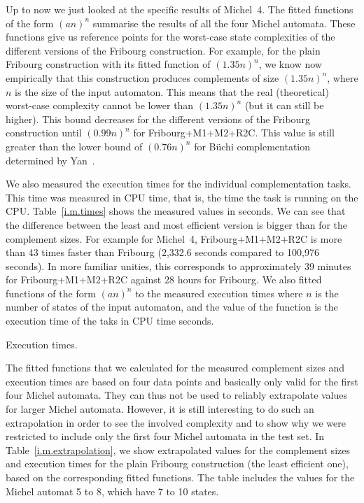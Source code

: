 Up to now we just looked at the specific results of Michel~4. The fitted functions of the form $(an)^n$ summarise the results of all the four Michel automata. These functions give us reference points for the worst-case state complexities of the different versions of the Fribourg construction. For example, for the plain Fribourg construction with its fitted function of $(1.35n)^n$, we know now empirically that this construction produces complements of size $(1.35n)^n$, where $n$ is the size of the input automaton. This means that the real (theoretical) worst-case complexity cannot be lower than $(1.35n)^n$ (but it can still be higher). This bound decreases for the different versions of the Fribourg construction until $(0.99n)^n$ for Fribourg+M1+M2+R2C. This value is still greater than the lower bound of $(0.76n)^n$ for Büchi complementation determined by Yan~\cite{2006_yan}.

We also measured the execution times for the individual complementation tasks. This time was measured in CPU time, that is, the time the task is running on the CPU. Table~\ref{i.m.times} shows the measured values in seconds. We can see that the difference between the least and most efficient version is bigger than for the complement sizes. For example for Michel~4, Fribourg+M1+M2+R2C is more than 43 times faster than Fribourg (2,332.6 seconds compared to 100,976 seconds). In more familiar unities, this corresponds to approximately 39 minutes for Fribourg+M1+M2+R2C against 28 hours for Fribourg. We also fitted functions of the form $(an)^n$ to the measured execution times where $n$ is the number of states of the input automaton, and the value of the function is the execution time of the taks in CPU time seconds.

\begin{table}[htb!]
\centering

\caption{Execution times.}
\label{i.m.times}
\end{table}

The fitted functions that we calculated for the measured complement sizes and execution times are based on four data points and basically only valid for the first four Michel automata. They can thus not be used to reliably extrapolate values for larger Michel automata. However, it is still interesting to do such an extrapolation in order to see the involved complexity and to show why we were restricted to include only the first four Michel automata in the test set. In Table~\ref{i.m.extrapolation}, we show extrapolated values for the complement sizes and execution times for the plain Fribourg construction (the least efficient one), based on the corresponding fitted functions. The table includes the values for the Michel automat 5 to 8, which have 7 to 10 states. 



